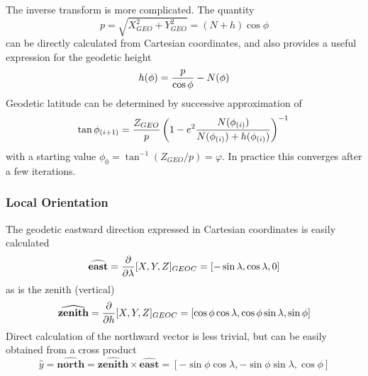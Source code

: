 \documentclass[11pt,twoside]{article}   %
\begin{document}
The inverse transform is more complicated. The quantity
 \begin{equation}
  p = \sqrt{X_{GEO}^2 + Y_{GEO}^2} = (N+h) \cos\phi
 \end{equation}
can be directly calculated from Cartesian coordinates, and also
provides a useful expression for the geodetic height
 \begin{equation}
   h(\phi) = {p \over \cos\phi} - N(\phi)
 \end{equation}
Geodetic latitude can be determined by successive approximation of
 \begin{equation}
  \tan\phi_{(i+1)} = {Z_{GEO}\over p} \left(1-e^2 {N(\phi_{(i)}) \over {N(\phi_{(i)}) + h(\phi_{(i)}) }} \right)^{-1} \\
 \end{equation}
with a starting value $\phi_{0} = \tan^{-1} \left( Z_{GEO} / p
\right) = \varphi $.  In practice this converges after a few
iterations.

 \subsubsection{Local Orientation}

The geodetic eastward direction expressed in Cartesian
coordinates is easily calculated
 \begin{equation}
   \widehat{\mathbf{east}} = {\partial \over \partial \lambda}
   [X,Y,Z]_{GEOC} = [ -\sin\lambda, \cos\lambda, 0]
 \end{equation}
as is the zenith (vertical)
 \begin{equation}
   \widehat{\mathbf{zenith}} = {\partial \over \partial h}
   [X,Y,Z]_{GEOC} = [ \cos\phi\cos\lambda, \cos\phi\sin\lambda, \sin\phi]
 \end{equation}
Direct calculation of the northward vector is less trivial, but
can be easily obtained from a cross product
 \begin{equation}
  \hat{y} = \widehat{\mathbf{north}} = \widehat{\mathbf{zenith}}
  \times \widehat{\mathbf{east}} = [ -\sin\phi \cos\lambda, -\sin\phi \sin\lambda, \cos\phi]
 \end{equation}
\end{document}
